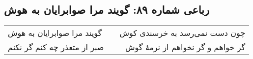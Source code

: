 \begin{center}
\section*{رباعی شماره ۸۹: گویند مرا صوابرایان به هوش}
\label{sec:089}
\begin{longtable}{l p{0.5cm} r}
گویند مرا صوابرایان به هوش
&&
چون دست نمی‌رسد به خرسندی کوش
\\
صبر از متعذر چه کنم گر نکنم
&&
گر خواهم و گر نخواهم از نرمهٔ گوش
\\
\end{longtable}
\end{center}
